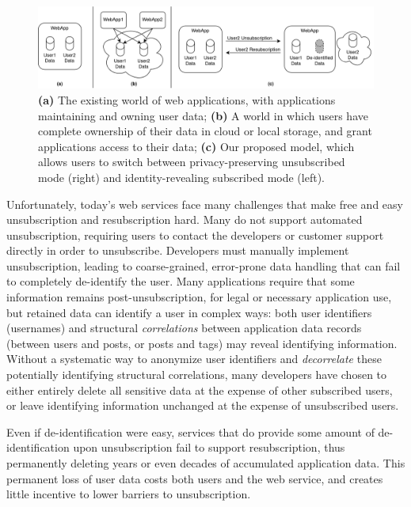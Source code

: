 \begin{figure}[ht!]
    \centering
    \includegraphics[width=\textwidth]{img/worlds}

    \caption{\textbf{(a)} The existing world of web applications, with applications maintaining and
    owning user data; \textbf{(b)} A world in which users have complete ownership of their data in cloud or local
    storage, and grant applications access to their data;
    \textbf{(c)} Our proposed model, which allows users to switch between privacy-preserving unsubscribed
    mode (right) and identity-revealing subscribed mode (left).}
    \label{fig:world}
\end{figure}


Unfortunately, today's web services face many challenges that make free and easy unsubscription and
resubscription hard. Many do not support automated unsubscription, requiring users to 
contact the developers or customer support directly in order to unsubscribe.
Developers must manually implement unsubscription, leading to coarse-grained, error-prone data
handling that can fail to completely de-identify the user. Many applications require that some
information remains post-unsubscription, for legal or necessary application use, but retained data
can identify a user in complex ways: both user identifiers (\eg usernames) and structural
\emph{correlations} between application data records (\eg between users and posts, or posts and
tags) may reveal identifying information.  Without a systematic way to anonymize user identifiers
and \emph{decorrelate} these potentially identifying structural correlations, many developers have
chosen to either entirely delete all sensitive data at the expense of other subscribed users, or
leave identifying information unchanged at the expense of unsubscribed users.

Even if de-identification were easy, services that do provide some amount of de-identification upon
unsubscription fail to support resubscription, thus permanently deleting years or even decades of
accumulated application data. This permanent loss of user data costs both users and the web
service, and creates little incentive to lower barriers to unsubscription.  

